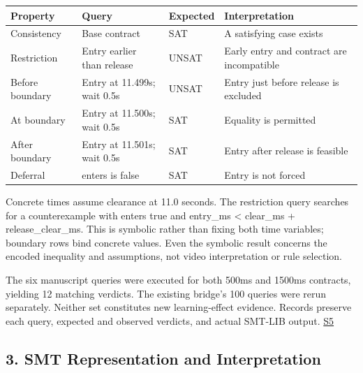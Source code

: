 \documentclass[11pt,a4paper]{article}
\begin{document}
\par\medskip\noindent\begin{minipage}{\linewidth}\small
\begin{tabular}{@{}>{\raggedright\arraybackslash}p{}>{\raggedright\arraybackslash}p{}>{\raggedright\arraybackslash}p{}>{\raggedright\arraybackslash}p{}@{}}
\toprule
\textbf{Property} & \textbf{Query} & \textbf{Expected} & \textbf{Interpretation} \\
\midrule
Consistency & Base contract & SAT & A satisfying case exists \\
Restriction & Entry earlier than release & UNSAT & Early entry and contract are incompatible \\
Before boundary & Entry at 11.499s; wait 0.5s & UNSAT & Entry just before release is excluded \\
At boundary & Entry at 11.500s; wait 0.5s & SAT & Equality is permitted \\
After boundary & Entry at 11.501s; wait 0.5s & SAT & Entry after release is feasible \\
Deferral & enters is false & SAT & Entry is not forced \\
\bottomrule\end{tabular}\end{minipage}\par\medskip

Concrete times assume clearance at 11.0 seconds. The restriction query searches for a counterexample with {\ttfamily\small enters} true and {\ttfamily\small entry\_ms < clear\_ms + release\_clear\_ms}. This is symbolic rather than fixing both time variables; boundary rows bind concrete values. Even the symbolic result concerns the encoded inequality and assumptions, not video interpretation or rule selection.\par

The six manuscript queries were executed for both 500ms and 1500ms contracts, yielding 12 matching verdicts. The existing bridge's 100 queries were rerun separately. Neither set constitutes new learning-effect evidence. Records preserve each query, expected and observed verdicts, and actual SMT-LIB output. \href{\detokenize{../methodology-2026-09-30-001/manuscript_examples.json}}{S5}\par

\subsection*{3. SMT Representation and Interpretation}
\end{document}
